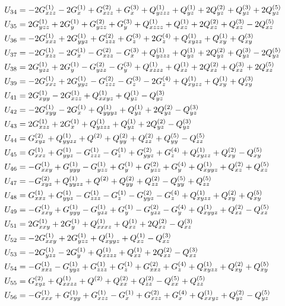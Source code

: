 \documentclass[11pt]{easymemo}
\begin{document}
\begin{align}
\cr&
U_{34}=-2G^{(1)}_{xzz} - 2G^{(1)}_{x} + G^{(2)}_{xzz} + G^{(3)}_{x} + Q^{(1)}_{yzzz} + Q^{(1)}_{yz} + 2Q^{(2)}_{yz} + Q^{(3)}_{yz} + 2Q^{(5)}_{yz}
\cr&
U_{35}=2G^{(1)}_{yzz} + 2G^{(1)}_{y} + G^{(2)}_{yzz} + G^{(3)}_{y} + Q^{(1)}_{xzzz} + Q^{(1)}_{xz} + 2Q^{(2)}_{xz} + Q^{(3)}_{xz} - 2Q^{(5)}_{xz}
\cr&
U_{36}=-2G^{(1)}_{xxz} + 2G^{(1)}_{yyz} + G^{(2)}_{zzz} + G^{(3)}_{z} + 2G^{(4)}_{z} + Q^{(1)}_{xyzz} + Q^{(1)}_{xy} + Q^{(3)}_{xy}
\cr&
U_{37}=-2G^{(1)}_{xzz} - 2G^{(1)}_{x} - G^{(2)}_{xzz} - G^{(3)}_{x} + Q^{(1)}_{yzzz} + Q^{(1)}_{yz} + 2Q^{(2)}_{yz} + Q^{(3)}_{yz} - 2Q^{(5)}_{yz}
\cr&
U_{38}=2G^{(1)}_{yzz} + 2G^{(1)}_{y} - G^{(2)}_{yzz} - G^{(3)}_{y} + Q^{(1)}_{xzzz} + Q^{(1)}_{xz} + 2Q^{(2)}_{xz} + Q^{(3)}_{xz} + 2Q^{(5)}_{xz}
\cr&
U_{39}=-2G^{(1)}_{xxz} + 2G^{(1)}_{yyz} - G^{(2)}_{zzz} - G^{(3)}_{z} - 2G^{(4)}_{z} + Q^{(1)}_{xyzz} + Q^{(1)}_{xy} + Q^{(3)}_{xy}
\cr&
U_{41}=2G^{(1)}_{xyy} - 2G^{(1)}_{xzz} + Q^{(1)}_{xxyz} + Q^{(1)}_{yz} - Q^{(3)}_{yz}
\cr&
U_{42}=-2G^{(1)}_{xyy} - 2G^{(1)}_{x} + Q^{(1)}_{yyyz} + Q^{(1)}_{yz} + 2Q^{(2)}_{yz} - Q^{(3)}_{yz}
\cr&
U_{43}=2G^{(1)}_{xzz} + 2G^{(1)}_{x} + Q^{(1)}_{yzzz} + Q^{(1)}_{yz} + 2Q^{(2)}_{yz} - Q^{(3)}_{yz}
\cr&
U_{44}=G^{(2)}_{xyz} + Q^{(1)}_{yyzz} + Q^{(2)} + Q^{(2)}_{yy} + Q^{(2)}_{zz} + Q^{(5)}_{yy} - Q^{(5)}_{zz}
\cr&
U_{45}=G^{(1)}_{xxz} + G^{(1)}_{yyz} - G^{(1)}_{zzz} - G^{(1)}_{z} + G^{(2)}_{yyz} + G^{(4)}_{z} + Q^{(1)}_{xyzz} + Q^{(2)}_{xy} - Q^{(5)}_{xy}
\cr&
U_{46}=-G^{(1)}_{xxy} + G^{(1)}_{yyy} - G^{(1)}_{yzz} + G^{(1)}_{y} + G^{(2)}_{yzz} + G^{(4)}_{y} + Q^{(1)}_{xyyz} + Q^{(2)}_{xz} + Q^{(5)}_{xz}
\cr&
U_{47}=-G^{(2)}_{xyz} + Q^{(1)}_{yyzz} + Q^{(2)} + Q^{(2)}_{yy} + Q^{(2)}_{zz} - Q^{(5)}_{yy} + Q^{(5)}_{zz}
\cr&
U_{48}=G^{(1)}_{xxz} + G^{(1)}_{yyz} - G^{(1)}_{zzz} - G^{(1)}_{z} - G^{(2)}_{yyz} - G^{(4)}_{z} + Q^{(1)}_{xyzz} + Q^{(2)}_{xy} + Q^{(5)}_{xy}
\cr&
U_{49}=-G^{(1)}_{xxy} + G^{(1)}_{yyy} - G^{(1)}_{yzz} + G^{(1)}_{y} - G^{(2)}_{yzz} - G^{(4)}_{y} + Q^{(1)}_{xyyz} + Q^{(2)}_{xz} - Q^{(5)}_{xz}
\cr&
U_{51}=2G^{(1)}_{xxy} + 2G^{(1)}_{y} + Q^{(1)}_{xxxz} + Q^{(1)}_{xz} + 2Q^{(2)}_{xz} - Q^{(3)}_{xz}
\cr&
U_{52}=-2G^{(1)}_{xxy} + 2G^{(1)}_{yzz} + Q^{(1)}_{xyyz} + Q^{(1)}_{xz} - Q^{(3)}_{xz}
\cr&
U_{53}=-2G^{(1)}_{yzz} - 2G^{(1)}_{y} + Q^{(1)}_{xzzz} + Q^{(1)}_{xz} + 2Q^{(2)}_{xz} - Q^{(3)}_{xz}
\cr&
U_{54}=-G^{(1)}_{xxz} - G^{(1)}_{yyz} + G^{(1)}_{zzz} + G^{(1)}_{z} + G^{(2)}_{xxz} + G^{(4)}_{z} + Q^{(1)}_{xyzz} + Q^{(2)}_{xy} + Q^{(5)}_{xy}
\cr&
U_{55}=G^{(2)}_{xyz} + Q^{(1)}_{xxzz} + Q^{(2)} + Q^{(2)}_{xx} + Q^{(2)}_{zz} - Q^{(5)}_{xx} + Q^{(5)}_{zz}
\cr&
U_{56}=-G^{(1)}_{xxx} + G^{(1)}_{xyy} + G^{(1)}_{xzz} - G^{(1)}_{x} + G^{(2)}_{xzz} + G^{(4)}_{x} + Q^{(1)}_{xxyz} + Q^{(2)}_{yz} - Q^{(5)}_{yz}

\end{align}
\end{document}
